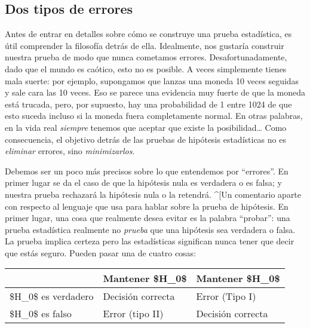 \documentclass[
]{book}
\begin{document}
\hypertarget{errortypes}{%
\subsection{Dos tipos de errores}\label{errortypes}}

Antes de entrar en detalles sobre cómo se construye una prueba estadística, es útil comprender la filosofía detrás de ella. Idealmente, nos gustaría construir nuestra prueba de modo que nunca cometamos errores. Desafortunadamente, dado que el mundo es caótico, esto no es posible. A veces simplemente tienes mala suerte: por ejemplo, supongamos que lanzas una moneda 10 veces seguidas y sale cara las 10 veces. Eso se parece una evidencia muy fuerte de que la moneda está trucada, pero, por supuesto, hay una probabilidad de 1 entre 1024 de que esto suceda incluso si la moneda fuera completamente normal. En otras palabras, en la vida real \emph{siempre} tenemos que aceptar que existe la posibilidad\ldots{} Como consecuencia, el objetivo detrás de las pruebas de hipótesis estadísticas no es \emph{eliminar} errores, sino \emph{minimizarlos}.

Debemos ser un poco más precisos sobre lo que entendemos por ``errores''. En primer lugar se da el caso de que la hipótesis nula es verdadera o es falsa; y nuestra prueba rechazará la hipótesis nula o la retendrá. \^{}{[}Un comentario aparte con respecto al lenguaje que usa para hablar sobre la prueba de hipótesis. En primer lugar, una cosa que realmente desea evitar es la palabra ``probar'': una prueba estadística realmente no \emph{prueba} que una hipótesis sea verdadera o falsa. La prueba implica certeza pero las estadísticas significan nunca tener que decir que estás seguro. Pueden pasar una de cuatro cosas:

\begin{tabular}{l|l|l}
\hline
 & Mantener \$H\_0\$ & Mantener \$H\_0\$\\
\hline
\$H\_0\$ es verdadero & Decisión correcta & Error (Tipo I)\\
\hline
\$H\_0\$ es falso & Error (tipo II) & Decisión correcta\\
\hline
\end{tabular}
\end{document}
